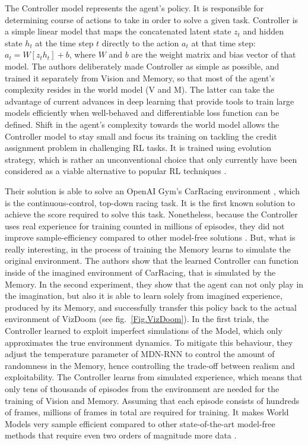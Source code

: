 The Controller model represents the agent's policy. It is responsible for determining course of actions to take in order to solve a given task. Controller is a simple linear model that maps the concatenated latent state $z_t$ and hidden state $h_t$ at the time step $t$ directly to the action $a_t$ at that time step: $a_t = W[z_t h_t] + b$, where $W$ and $b$ are the weight matrix and bias vector of that model.
The authors deliberately made Controller as simple as possible, and trained it separately from Vision and Memory, so that most of the agent's complexity resides in the world model (V and M). The latter can take the advantage of current advances in deep learning that provide tools to train large models efficiently when well-behaved and differentiable loss function can be defined.
Shift in the agent's complexity towards the world model allows the Controller model to stay small and focus its training on tackling the credit assignment problem in challenging RL tasks. It is trained using evolution strategy, which is rather an unconventional choice that only currently have been considered as a viable alternative to popular RL techniques \cite{Algo.ESRL}.

 Their solution is able to solve an OpenAI Gym's CarRacing environment \cite{Code.OpenAIGym}, which is the continuous-control, top-down racing task. It is the first known solution to achieve the score required to solve this task. Nonetheless, because the Controller uses real experience for training counted in millions of episodes, they did not improve sample-efficiency compared to other model-free solutions \cite{Algo.CarRacingA3C}. But, what is really interesting, in the process of training the Memory learns to simulate the original environment. The authors show that the learned Controller can function inside of the imagined environment of CarRacing, that is simulated by the Memory.
In the second experiment, they show that the agent can not only play in the imagination, but also it is able to learn solely from imagined experience, produced by its Memory, and successfully transfer this policy back to the actual environment of VizDoom (see fig.~\ref{Fig.VizDoom}). In the first trials, the Controller learned to exploit imperfect simulations of the Model, which only approximates the true environment dynamics. To mitigate this behaviour, they adjust the temperature parameter of MDN-RNN to control the amount of randomness in the Memory, hence controlling the trade-off between realism and exploitability.
The Controller learns from simulated experience, which means that only tens of thousands of episodes from the environment are needed for the training of Vision and Memory. Assuming that each episode consists of hundreds of frames, millions of frames in total are required for training. It makes World Models very sample efficient compared to other state-of-the-art model-free methods that require even two orders of magnitude more data \cite{Algo.A3C}.

